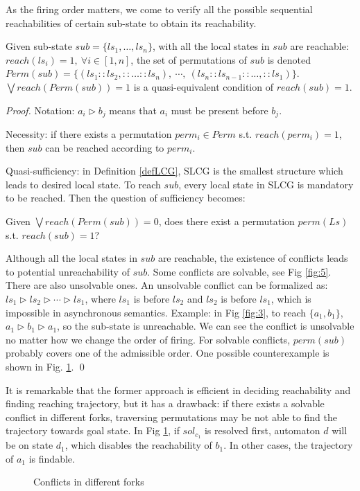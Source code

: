 \documentclass[runningheads]{llncs}
\begin{document}
As the firing order matters, we come to verify all the possible sequential reachabilities of certain sub-state to obtain its reachability.

\begin{theorem}\label{theoperm}
Given sub-state $sub=\{ls_1,\ldots,ls_n\}$, with all the local states in $sub$ are reachable: $reach (ls_i)=1,\ \forall i\in[1,n]$, the set of permutations of $sub$ is denoted $Perm (sub)=\{(ls_1::ls_2,::\ldots ::ls_n),\ \cdots,\ (ls_n::ls_{n-1}::\ldots,::ls_1)\}$. $\bigvee reach (Perm (sub))=1$ is a quasi-equivalent condition of $reach (sub)=1$.
\end{theorem}
\begin{proof}
Notation: $a_i\triangleright b_j$ means that $a_i$ must be present before $b_j$.

Necessity: if there exists a permutation $perm_i\in Perm$ s.t. $reach (perm_i)=1$, then $sub$ can be reached according to $perm_i$.

Quasi-sufficiency: in Definition \ref{defLCG}, SLCG is the smallest structure which leads to desired local state. To reach $sub$, every local state in SLCG is mandatory to be reached. Then the question of sufficiency becomes:

Given $\bigvee reach (Perm (sub))=0$, does there exist a permutation $perm (Ls)$ s.t. $reach (sub)=1$?

Although all the local states in $sub$ are reachable, the existence of conflicts leads to potential unreachability of $sub$. Some conflicts are solvable, see Fig \ref{fig:5}. There are also unsolvable ones. An unsolvable conflict can be formalized as: $ls_1\triangleright ls_2 \triangleright \cdots \triangleright ls_1$, where $ls_1$ is before $ls_2$ and $ls_2$ is before $ls_1$, which is impossible in asynchronous semantics. Example: in Fig \ref{fig:3}, to reach $\{a_1,b_1\}$, $a_1\triangleright b_1\triangleright a_1$, so the sub-state is unreachable. We can see the conflict is unsolvable no matter how we change the order of firing. For solvable conflicts, $perm(sub)$ probably covers one of the admissible order. One possible counterexample is shown in Fig. \ref{FigConflictInForks}. %
\qed\end{proof}

It is remarkable that the former approach is efficient in deciding reachability and finding reaching trajectory, but it has a drawback: if there exists a solvable conflict in different forks, traversing permutations may be not able to find the trajectory towards goal state. In Fig \ref{FigConflictInForks}, if $sol_{c_1}$ is resolved first, automaton $d$ will be on state $d_1$, which disables the reachability of $b_1$. In other cases, the trajectory of $a_1$ is findable.%
\begin{figure}[ht]
\centering

\caption{Conflicts in different forks}\label{FigConflictInForks}
\end{figure}
\end{document}
